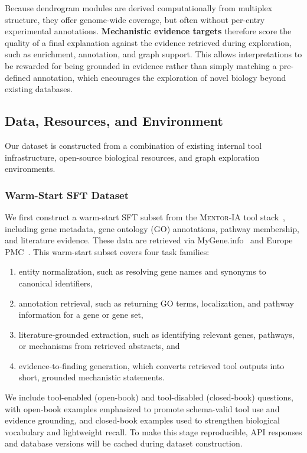 \documentclass[thesis,letterpaper,12pt]{utthesis}
\begin{document}
Because dendrogram modules are derived computationally from multiplex structure, they offer genome-wide coverage, but often without per-entry experimental annotations. \textbf{Mechanistic evidence targets} therefore score the quality of a final explanation against the evidence retrieved during exploration, such as enrichment, annotation, and graph support. This allows interpretations to be rewarded for being grounded in evidence rather than simply matching a pre-defined annotation, which encourages the exploration of novel biology beyond existing databases.

\subsection{Data, Resources, and Environment}\label{sec:data}
Our dataset is constructed from a combination of existing internal tool infrastructure, open-source biological resources, and graph exploration environments.

\subsubsection{Warm-Start SFT Dataset} 
We first construct a warm-start SFT subset from the \textsc{Mentor-IA} tool stack~\cite{mentor-ia}, including gene metadata, gene ontology (GO) annotations, pathway membership, and literature evidence. These data are retrieved via MyGene.info~\cite{mygene.info} and Europe PMC~\cite{europepmc}. This warm-start subset covers four task families:
\begin{enumerate}
    \item entity normalization, such as resolving gene names and synonyms to canonical identifiers,
    \item annotation retrieval, such as returning GO terms, localization, and pathway information for a gene or gene set,
    \item literature-grounded extraction, such as identifying relevant genes, pathways, or mechanisms from retrieved abstracts, and
    \item evidence-to-finding generation, which converts retrieved tool outputs into short, grounded mechanistic statements.
\end{enumerate}

We include tool-enabled (open-book) and tool-disabled (closed-book) questions, with open-book examples emphasized to promote schema-valid tool use and evidence grounding, and closed-book examples used to strengthen biological vocabulary and lightweight recall. To make this stage reproducible, API responses and database versions will be cached during dataset construction.
\end{document}
